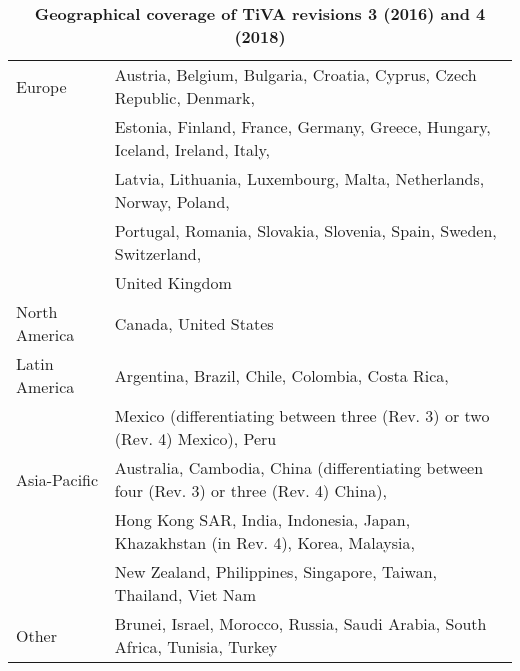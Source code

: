 \documentclass[11pt,a4paper]{paper} %
\begin{document}
\begin{table}[!h]
\begin{threeparttable}
\centering
\centering
\caption{\small{\textbf{Geographical coverage of TiVA revisions 3 (2016) and 4 (2018)}}}
\small
\begin{tabular}{ll}
\hline\hline
Europe & Austria, Belgium, Bulgaria, Croatia, Cyprus, Czech Republic, Denmark,\\
& Estonia, Finland, France, Germany, Greece, Hungary, Iceland, Ireland, Italy,\\
& Latvia, Lithuania, Luxembourg, Malta, Netherlands, Norway, Poland,\\
&Portugal, Romania, Slovakia, Slovenia, Spain, Sweden, Switzerland,\\
& United Kingdom\\
North  America& Canada, United States\\
Latin America & Argentina, Brazil, Chile, Colombia, Costa Rica, \\ 
&Mexico (differentiating between three (Rev. 3) or two (Rev. 4) Mexico), Peru\\
Asia-Pacific & Australia, Cambodia, China (differentiating between four (Rev. 3) or three (Rev. 4) China), \\
& Hong Kong SAR, India, Indonesia, Japan, Khazakhstan (in Rev. 4), Korea, Malaysia, \\
& New Zealand, Philippines, Singapore, Taiwan, Thailand, Viet Nam\\
Other & Brunei, Israel, Morocco, Russia, Saudi Arabia, South Africa, Tunisia, Turkey\\
\hline\hline
\end{tabular} 
\label{tab:tiva}
\end{threeparttable}
\end{table} 
\end{document}
